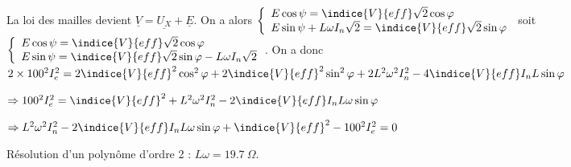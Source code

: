 \ifprof
\begin{corrige}
La loi des mailles devient $\underline{V} = \underline{U_X} +  \underline{E}$.
On a alors 
$\left\{
\begin{array}{l}
E\cos \psi = \indice{V}{eff} \sqrt{2} \cos\varphi \\
E\sin \psi + L\omega I_n \sqrt{2} = \indice{V}{eff} \sqrt{2}\sin\varphi \\
\end{array}
\right.
$
soit 
$\left\{
\begin{array}{l}
E\cos \psi = \indice{V}{eff} \sqrt{2} \cos\varphi \\
E\sin \psi = \indice{V}{eff} \sqrt{2}\sin\varphi -  L\omega I_n \sqrt{2}\\
\end{array}
\right.
$.
On a donc 
$2 \times 100^2 I_e^2  = 2\indice{V}{eff}^2 \cos^2\varphi +  2 \indice{V}{eff}^2 \sin^2\varphi + 2L^2\omega^2 I_n^2 - 
4 \indice{V}{eff} I_n  L \sin\varphi $

$\Rightarrow   100^2 I_e^2  = \indice{V}{eff}^2 + L^2\omega^2 I_n^2 - 2 \indice{V}{eff} I_n  L\omega \sin\varphi $

$\Rightarrow    L^2\omega^2 I_n^2 - 2 \indice{V}{eff} I_n  L\omega \sin\varphi + \indice{V}{eff}^2 - 100^2 I_e^2  = 0 $

Résolution d'un polynôme d'ordre 2 : $L\omega = \SI{19,7}{\Omega}$.
\end{corrige}
\else
\fi

